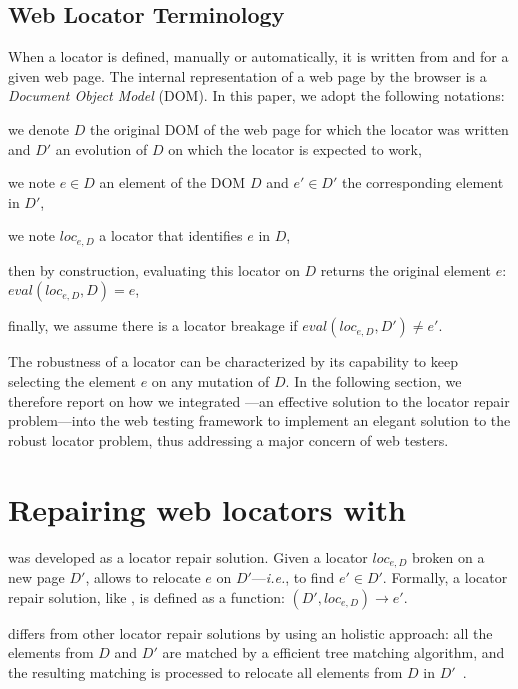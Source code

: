 \subsection{Web Locator Terminology}
When a locator is defined, manually or automatically, it is written from and for a given web page.
The internal representation of a web page by the browser is a \emph{Document Object Model} (DOM).
In this paper, we adopt the following notations:
\begin{compactitem}
    \item we denote $D$ the original DOM of the web page for which the locator was written and $D'$ an evolution of $D$ on which the locator is expected to work,
    \item we note $e \in D$ an element of the DOM $D$ and $e'\in D'$ the corresponding element in $D'$,
    \item we note $loc_{e, D}$ a locator that identifies $e$ in $D$,
    \item then by construction, evaluating this locator on $D$ returns the original element $e$: $eval(loc_{e, D}, D) = e$,
    \item finally, we assume there is a locator breakage if $eval(loc_{e, D}, D') \neq e'$.
\end{compactitem}

The robustness of a locator can be characterized by its capability to keep selecting the element $e$ on any mutation of $D$.
In the following section, we therefore report on how we integrated \erratum---an effective solution to the locator repair problem---into the \cerberus web testing framework to implement an elegant solution to the robust locator problem, thus addressing a major concern of web testers.

\section{Repairing web locators with \erratum}\label{sec:erratum}
\erratum was developed as a locator repair solution. 
Given a locator $loc_{e, D}$ broken on a new page $D'$, \erratum allows to relocate $e$ on $D'$---\emph{i.e.}, to find $e' \in D'$.
Formally, a locator repair solution, like \erratum, is defined as a function: $(D', loc_{e, D}) \to e'$.

\erratum differs from other locator repair solutions by using an holistic approach: all the elements from $D$ and $D'$ are matched by a efficient tree matching algorithm, and the resulting matching is processed to relocate all elements from $D$ in $D'$~\cite{brisset2021erratum}.

